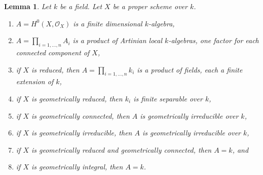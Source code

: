 \documentclass[10pt,a4paper]{amsart}
\theoremstyle{plain}
\newtheorem{lemma}[subsection]{Lemma}
\theoremstyle{definition}
\theoremstyle{remark}
\numberwithin{equation}{subsection}
\begin{document}
\begin{lemma}
\label{lemma-proper-geometrically-reduced-global-sections}
Let $k$ be a field. Let $X$ be a proper scheme over $k$.
\begin{enumerate}
\item $A = H^0(X, \mathcal{O}_X)$ is a finite dimensional $k$-algebra,
\item $A = \prod_{i = 1, \ldots, n} A_i$ is a product of Artinian
local $k$-algebras, one factor for each connected component of $X$,
\item if $X$ is reduced, then $A = \prod_{i = 1, \ldots, n} k_i$
is a product of fields, each a finite extension of $k$,
\item if $X$ is geometrically reduced, then $k_i$ is finite separable
over $k$,
\item if $X$ is geometrically connected, then $A$ is geometrically
irreducible over $k$,
\item if $X$ is geometrically irreducible, then $A$ is geometrically
irreducible over $k$,
\item if $X$ is geometrically reduced and geometrically connected, then
$A = k$, and
\item if $X$ is geometrically integral, then $A = k$.
\end{enumerate}
\end{lemma}
\end{document}
